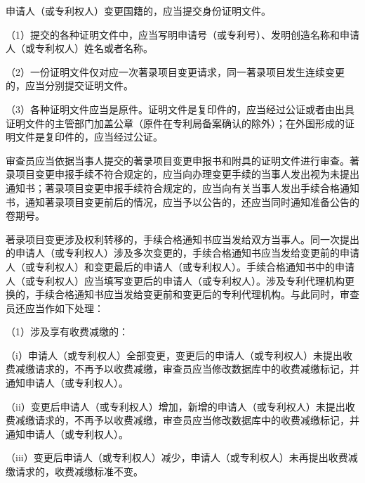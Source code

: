 申请人（或专利权人）变更国籍的，应当提交身份证明文件。

{\setlength{\parindent}{17.1bp}（1）提交的各种证明文件中，应当写明申请号（或专利号）、发明创造名称和申请人（或专利权人）姓名或者名称。\par}

{\setlength{\parindent}{17.1bp}（2）一份证明文件仅对应一次著录项目变更请求，同一著录项目发生连续变更的，应当分别提交证明文件。\par}

{\setlength{\parindent}{17.1bp}（3）各种证明文件应当是原件。证明文件是复印件的，应当经过公证或者由出具证明文件的主管部门加盖公章（原件在专利局备案确认的除外）；在外国形成的证明文件是复印件的，应当经过公证。\par}

审查员应当依据当事人提交的著录项目变更申报书和附具的证明文件进行审查。著录项目变更申报手续不符合规定的，应当向办理变更手续的当事人发出视为未提出通知书；著录项目变更申报手续符合规定的，应当向有关当事人发出手续合格通知书，通知著录项目变更前后的情况，应当予以公告的，还应当同时通知准备公告的卷期号。

著录项目变更涉及权利转移的，手续合格通知书应当发给双方当事人。同一次提出的申请人（或专利权人）涉及多次变更的，手续合格通知书应当发给变更前的申请人（或专利权人）和变更最后的申请人（或专利权人）。手续合格通知书中的申请人（或专利权人）应当填写变更后的申请人（或专利权人）。涉及专利代理机构更换的，手续合格通知书应当发给变更前和变更后的专利代理机构。与此同时，审查员还应当作如下处理：

{\setlength{\parindent}{17.1bp}（1）涉及享有收费减缴的：\par}

{\setlength{\parindent}{17.1bp}（i）申请人（或专利权人）全部变更，变更后的申请人（或专利权人）未提出收费减缴请求的，不再予以收费减缴，审查员应当修改数据库中的收费减缴标记，并通知申请人（或专利权人）。\par}

{\setlength{\parindent}{17.1bp}（ii）变更后申请人（或专利权人）增加，新增的申请人（或专利权人）未提出收费减缴请求的，不再予以收费减缴，审查员应当修改数据库中的收费减缴标记，并通知申请人（或专利权人）。\par}

{\setlength{\parindent}{17.1bp}（iii）变更后申请人（或专利权人）减少，申请人（或专利权人）未再提出收费减缴请求的，收费减缴标准不变。\par}


